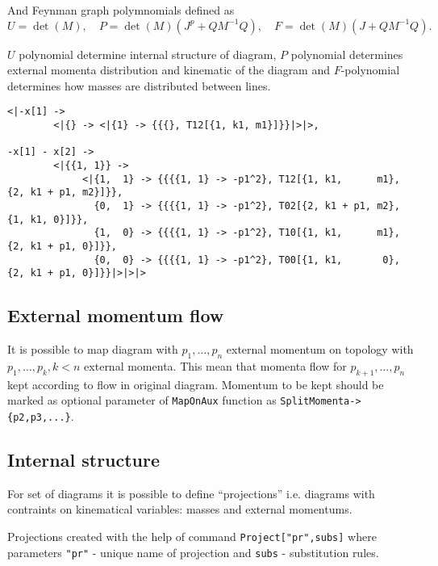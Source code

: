 \documentclass[a4paper,11pt]{article}
\newcommand{\ctt}[1]{\textcolor{OliveGreen}{\texttt{#1}}}
\begin{document}
And Feynman graph polymnomials defined as
\begin{equation}
  \label{eq:UFMdef}
  U=\det(M),\quad P=\det(M)(J^p+QM^{-1}Q),\quad F=\det(M)(J+QM^{-1}Q).
\end{equation}

$U$ polynomial determine internal structure of diagram, $P$ polynomial
determines external momenta distribution and kinematic of the diagram
and $F$-polynomial determines how masses are distributed between lines.


\begin{verbatim}
<|-x[1] -> 
        <|{} -> <|{1} -> {{{}, T12[{1, k1, m1}]}}|>|>, 

-x[1] - x[2] -> 
        <|{{1, 1}} -> 
             <|{1,  1} -> {{{{1, 1} -> -p1^2}, T12[{1, k1,      m1}, {2, k1 + p1, m2}]}}, 
               {0,  1} -> {{{{1, 1} -> -p1^2}, T02[{2, k1 + p1, m2}, {1, k1, 0}]}}, 
               {1,  0} -> {{{{1, 1} -> -p1^2}, T10[{1, k1,      m1}, {2, k1 + p1, 0}]}}, 
               {0,  0} -> {{{{1, 1} -> -p1^2}, T00[{1, k1,       0}, {2, k1 + p1, 0}]}}|>|>|>
\end{verbatim}

\subsection{External momentum flow}
\label{sec:extflow}

It is possible to map diagram with $p_1,\dots,p_n$ external momentum on topology
with $p_1,\dots,p_k,k<n$ external momenta. This mean that momenta flow
for $p_{k+1},\dots,p_n$ kept according to flow in original
diagram. Momentum to be kept should be marked as optional parameter of
\ctt{MapOnAux} function as \ctt{SplitMomenta->\{p2,p3,...\}}.

\subsection{Internal structure}

For set of diagrams it is possible to define ``projections'' i.e.
diagrams with contraints on kinematical variables: masses and external
momentums.

Projections created with the help of command \texttt{Project["pr",subs]} where
parameters \texttt{"pr"} - unique name of projection and \texttt{subs}
- substitution rules.



 
\end{document}
